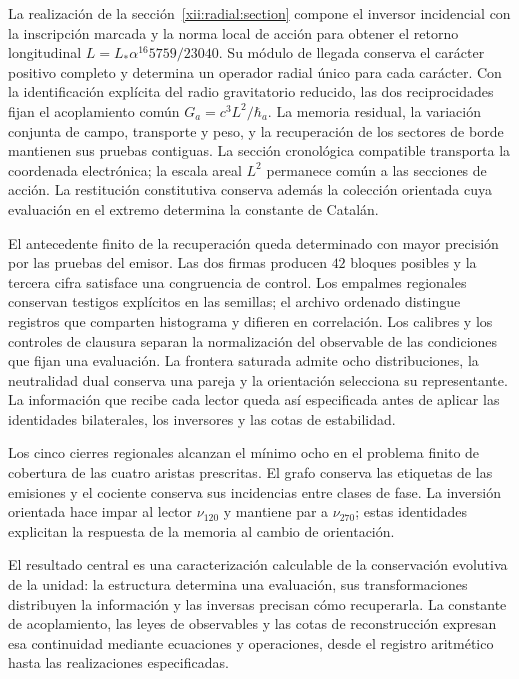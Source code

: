 La realización de la sección~\ref{xii:radial:section} compone el inversor
incidencial con la inscripción marcada y la norma local de acción para
obtener el retorno longitudinal \(L=L_*\alpha^{16}5759/23040\).
Su módulo de llegada conserva el carácter positivo completo y determina
un operador radial único para cada carácter. Con la identificación explícita
del radio gravitatorio reducido, las dos reciprocidades fijan el acoplamiento
común \(G_a=c^3L^2/\hbar_a\). La memoria residual, la variación conjunta
de campo, transporte y peso, y la recuperación de los sectores de borde
mantienen sus pruebas contiguas. La sección cronológica compatible transporta
la coordenada electrónica; la escala areal \(L^2\) permanece común a las
secciones de acción. La restitución constitutiva conserva además la colección
orientada cuya evaluación en el extremo determina la constante de Catalán.

El antecedente finito de la recuperación queda determinado con mayor
precisión por las pruebas del emisor. Las dos firmas producen \(42\)
bloques posibles y la tercera cifra satisface una congruencia de
control. Los empalmes regionales conservan testigos explícitos en las
semillas; el archivo ordenado distingue registros que comparten
histograma y difieren en correlación. Los calibres y los controles de
clausura separan la normalización del observable de las condiciones
que fijan una evaluación. La frontera saturada admite ocho
distribuciones, la neutralidad dual conserva una pareja y la orientación
selecciona su representante. La información que recibe cada lector
queda así especificada antes de aplicar las identidades bilaterales,
los inversores y las cotas de estabilidad.

Los cinco cierres regionales alcanzan el mínimo ocho en el problema
finito de cobertura de las cuatro aristas prescritas. El grafo conserva
las etiquetas de las emisiones y el cociente conserva sus incidencias
entre clases de fase. La inversión orientada hace impar al lector
\(\nu_{120}\) y mantiene par a \(\nu_{270}\); estas identidades
explicitan la respuesta de la memoria al cambio de orientación.



El resultado central es una caracterización calculable de la conservación evolutiva de la unidad: la estructura determina una evaluación, sus transformaciones distribuyen la información y las inversas precisan cómo recuperarla. La constante de acoplamiento, las leyes de observables y las cotas de reconstrucción expresan esa continuidad mediante ecuaciones y operaciones, desde el registro aritmético hasta las realizaciones especificadas.
